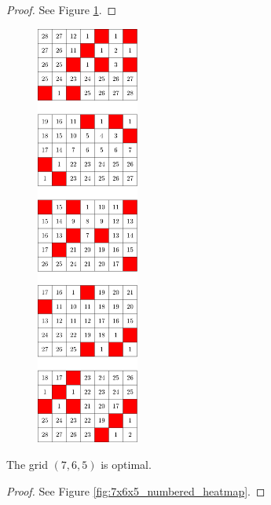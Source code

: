 \begin{proof}
See Figure \ref{fig:7x5x5_numbered_heatmap}.
\end{proof}

\begin{figure}[H]
\centering
\includegraphics[width=0.3\textwidth]{figures/A/7x5x5_numbered_heatmap.pdf}
\caption{}
\label{fig:7x5x5_numbered_heatmap}
\end{figure}

\newpage

\begin{con}
\label{con:7x6x5}
The grid $(7,6,5)$ is optimal.
\end{con}

\begin{proof}
See Figure \ref{fig:7x6x5_numbered_heatmap}.
\end{proof}

